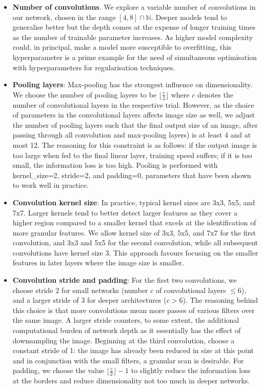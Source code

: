 \documentclass[british,12p]{article}
\begin{document}
    
    \begin{itemize}
    	\item \textbf{Number of convolutions}. We explore a variable number of convolutions in our network, chosen  in the range $[4, 8] \cap \mathbb{N}$. Deeper models tend to generalise better but the depth comes at the expense of longer training times as the number of trainable parameter increases. As higher model complexity could, in principal, make a model more susceptible to overfitting, this hyperparameter is a prime example for the need of simultaneous optimisation with hyperparameters for regularisation techniques.
    	\item \textbf{Pooling layers}: Max-pooling has the strongest influence on dimensionality. We choose the number of pooling layers to be $\lfloor \frac{c}{2}\rfloor$ where $c$ denotes the number of convolutional layers in the respective trial. However, as the choice of parameters in the convolutional layers affects image size as well, we adjust the number of pooling layers such that the final output size of an image, after passing through all convolution and max-pooling layers) is at least 4 and at most 12. The reasoning for this constraint is as follows: if the output image is too large when fed to the final linear layer, training speed suffers; if it is too small, the information loss is too high. Pooling is performed with kernel\_size=2, stride=2, and padding=0, parameters that have been shown to work well in practice.
    	\item \textbf{Convolution kernel size}: In practice, typical kernel sizes are 3x3, 5x5, and 7x7. Larger kernels tend to better detect larger features as they cover a higher region compared to a smaller kernel that excels at the identification of more granular features. We allow kernel size of 3x3, 5x5, and 7x7 for the first convolution, and 3x3 and 5x5 for the second convolution, while all subsequent convolutions have kernel size 3. This approach favours focusing on the smaller features in later layers where the image size is smaller.  
    	\item \textbf{Convolution stride and padding}: For the first two convolutions, we choose stride 2 for small networks (number $c$ of convolutional layers $\le 6$), and a larger stride of 3 for deeper architectures ($c > 6$). The reasoning behind this choice is that more convolutions mean more passes of various filters over the same image. A larger stride counters, to some extent, the additional computational burden of network depth as it essentially has the effect of downsampling the image. Beginning at the third convolution, choose a constant stride of 1: the image has already been reduced in size at this point and in conjunction with the small filters, a granular scan is desirable. For padding, we choose the value $\lfloor \frac{c}{2}\rfloor - 1$ to slightly reduce the information loss at the borders and reduce dimensionality not too much in deeper networks. 

\end{itemize}
\end{document}
